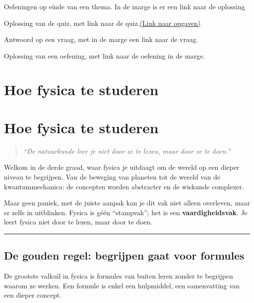 {\begin{oef}
Oefeningen op einde van een thema. In de marge is er een link naar de oplossing
\end{oef}
\begin{oplq}
Oplossing van de quiz, met link naar de quiz.\hyperref[q: voorwoord]{(Link naar opgaven)}
\end{oplq}
\begin{ant}\label{opl vH0:vb}
Antwoord op een vraag, met in de marge een link naar de vraag.
\end{ant}
\begin{opl}\label{opl oH0:vb}
Oplossing van een oefening, met link naar de oefening in de marge.
\end{opl}
\section*{Hoe fysica te studeren}
\section{Hoe fysica te studeren}
\begin{quote}
\textit{“De natuurkunde leer je niet door ze te lezen, maar door ze te doen.”}
\end{quote}

Welkom in de derde graad, waar fysica je uitdaagt om de wereld op een dieper niveau te begrijpen.  
Van de beweging van planeten tot de wereld van de kwantummechanica: de concepten worden abstracter en de wiskunde complexer.  

Maar geen paniek, met de juiste aanpak kan je dit vak niet alleen overleven, maar er zelfs in uitblinken.  
Fysica is géén “stampvak”; het is een \textbf{vaardigheidsvak}.  
Je leert fysica niet door te lezen, maar door te doen.

\begin{center}
\rule{0.6\textwidth}{0.4pt}
\end{center}

\subsection*{De gouden regel: begrijpen gaat voor formules}

\begin{theorie}
De grootste valkuil in fysica is formules van buiten leren zonder te begrijpen waarom ze werken.  
Een formule is enkel een hulpmiddel, een samenvatting van een dieper concept.
\end{theorie}

}

